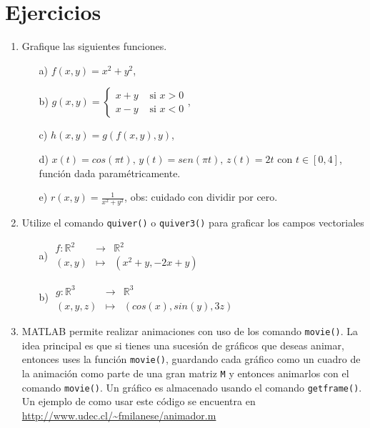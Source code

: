 \documentclass[11pt]{article}
\begin{document}
\section{Ejercicios}
\begin{enumerate}
 \item Grafique las siguientes funciones.
    \begin{multicols}{2}
    \begin{itemize}
     \item[a)]	$f(x,y)=x^2+y^2$,
     \item[b)]	$g(x,y)=\begin{cases}
               	          x+y & \text{ si } x>0\\
               	          x-y & \text{ si } x<0
               	         \end{cases}$,
    \item[c)]	$h(x,y)=g(f(x,y),y)$,
    \item[d)]	$x(t)=cos(\pi t), \, y(t)=sen(\pi t), \, z(t)=2t$ con $t\in[0,4]$, funci\'on dada param\'etricamente.
    \item[e)]	$r(x,y)=\frac{1}{x^2+y^2}$, obs: cuidado con dividir por cero.
    \end{itemize}
    \end{multicols}
    
 \item Utilize el comando \texttt{quiver()} o \texttt{quiver3()} para graficar los campos vectoriales
 \begin{multicols}{2}
    \begin{itemize}
     \item[a)] $
     \begin{array}{cll}
	f:\mathbb{R}^2 & \longrightarrow	& \mathbb{R}^2 \\
	(x,y)		& \longmapsto		& (x^2+y,-2x+y)	
     \end{array}
	   $
	   
       \item[b)] $
     \begin{array}{cll}
	g:\mathbb{R}^3 & \longrightarrow	& \mathbb{R}^3 \\
	(x,y,z)		& \longmapsto		& (cos(x),sin(y),3z)	
     \end{array}
	   $
    \end{itemize}
    \end{multicols}
    
 \item MATLAB permite realizar animaciones con uso de los comando \texttt{movie()}. La idea 
 principal es que si tienes una sucesi\'on de gr\'aficos que deseas animar, entonces 
 uses la funci\'on \texttt{movie()}, guardando cada gr\'afico como un cuadro de la animaci\'on como 
 parte de una gran matriz \texttt{M} y entonces animarlos con el comando \texttt{movie()}. Un gr\'afico 
 es almacenado usando el comando \texttt{getframe()}. Un ejemplo de como usar este c\'odigo se encuentra en
 \url{http://www.udec.cl/~fmilanese/animador.m}
 

\end{enumerate}
\end{document}
